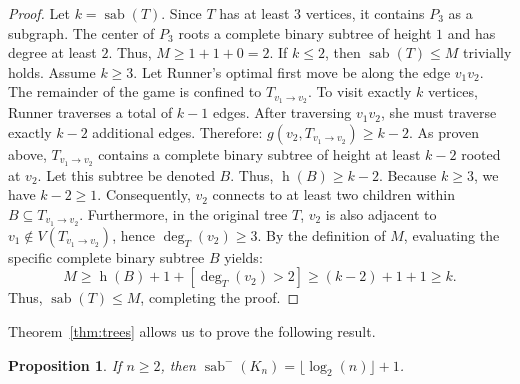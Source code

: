 \documentclass[12pt]{article}
\newtheorem{proposition}[theorem]{Proposition}
\DeclareMathOperator{\sab}{\mathrm{sab}}
\DeclareMathOperator{\height}{\mathrm{h}}
\begin{document}
\begin{proof}
Let $k = \sab(T)$. Since $T$ has at least $3$ vertices, it contains $P_3$ as a subgraph. The center of $P_3$ roots a complete binary subtree of height $1$ and has degree at least $2$. Thus, $M \ge 1 + 1 + 0 = 2$. If $k \le 2$, then $\sab(T) \le M$ trivially holds. 
Assume $k \ge 3$. Let Runner's optimal first move be along the edge $v_1v_2$. The remainder of the game is confined to $T_{v_1 \to v_2}$. To visit exactly $k$ vertices, Runner traverses a total of $k-1$ edges. After traversing $v_1v_2$, she must traverse exactly $k-2$ additional edges. Therefore: 
$g(v_2, T_{v_1 \to v_2}) \ge k-2$.
As proven above, $T_{v_1 \to v_2}$ contains a complete binary subtree of height at least $k-2$ rooted at $v_2$. Let this subtree be denoted $B$. Thus, $\height(B) \ge k-2$. 
Because $k \ge 3$, we have $k-2 \ge 1$. Consequently, $v_2$ connects to at least two children within $B \subseteq T_{v_1 \to v_2}$. Furthermore, in the original tree $T$, $v_2$ is also adjacent to $v_1 \notin V(T_{v_1 \to v_2})$, hence $\deg_T(v_2) \ge 3$.
By the definition of $M$, evaluating the specific complete binary subtree $B$ yields:
$$M \ge \height(B) + 1 + [\deg_T(v_2) > 2] \ge (k-2) + 1 + 1 \ge k.$$
Thus, $\sab(T) \le M$, completing the proof.
\end{proof}

Theorem~\ref{thm:trees} allows us to prove the following result. 

\begin{proposition}
\label{prp:complete-graphs-lower}
If $n\ge 2$, then $\sab^{-}(K_n) = \lfloor \log_2(n) \rfloor + 1$.
\end{proposition}
\end{document}
